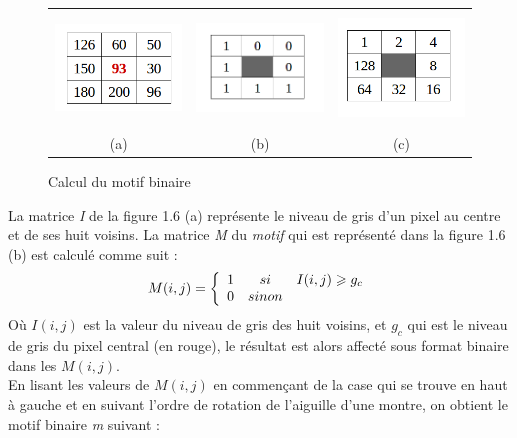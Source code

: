 \begin{figure}[H]
\centering
\begin{tabular}{ccc}
\centering

\includegraphics[width=5cm,height=3cm]{Figures/chap1/matrice1.png}
&
\includegraphics[width=5cm,height=3cm]{Figures/chap1/matrice2.png}
&
\includegraphics[width=5cm,height=3cm]{Figures/chap1/matrice3.png}\\
(a) & (b) & (c)\\
\end{tabular}
\caption[CalcMotif]{Calcul du motif binaire}
\end{figure}

\indent La matrice \textit{I} de la figure 1.6 (a) représente le niveau de gris d'un pixel au centre et de ses huit voisins. La matrice \textit{M} du \textit{motif} qui est représenté dans la figure 1.6 (b) est calculé comme suit :
$$M(i,j) = \left\{
\begin{array}{c c c}      
    1 & si & I(i,j)\geqslant g_{c}\\
    0 & sinon & 
\end{array}\right. $$
Où $I(i,j)$ est la valeur du niveau de gris des huit voisins, et $g_{c}$ qui est le niveau de gris du pixel central (en rouge), le résultat est alors affecté sous format binaire dans les $M(i,j)$.\\
En lisant les valeurs de $M(i,j)$ en commençant de la case qui se trouve en haut à gauche et en suivant l'ordre de rotation de l'aiguille d'une montre, on obtient le motif binaire \textit{m} suivant :

